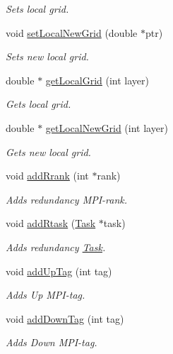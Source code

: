 \begin{DoxyCompactItemize}
\begin{DoxyCompactList}\small\item\em Sets local grid. \end{DoxyCompactList}\item 
void \hyperlink{classTask_ab1bfcab76d0b801d21139fa2280a0c4d}{set\+Local\+New\+Grid} (double $\ast$ptr)
\begin{DoxyCompactList}\small\item\em Sets new local grid. \end{DoxyCompactList}\item 
double $\ast$ \hyperlink{classTask_a0a3647a3c3b957a204f9d50a17438524}{get\+Local\+Grid} (int layer)
\begin{DoxyCompactList}\small\item\em Gets local grid. \end{DoxyCompactList}\item 
double $\ast$ \hyperlink{classTask_aa589e673faa616d16dcf305df0f98f7c}{get\+Local\+New\+Grid} (int layer)
\begin{DoxyCompactList}\small\item\em Gets new local grid. \end{DoxyCompactList}\item 
void \hyperlink{classTask_a1e6121b88342e745c95a5299b4d97ffd}{add\+Rrank} (int $\ast$rank)
\begin{DoxyCompactList}\small\item\em Adds redundancy M\+P\+I-\/rank. \end{DoxyCompactList}\item 
void \hyperlink{classTask_aa6908a92f145c47dd0d36fb898d4365b}{add\+Rtask} (\hyperlink{classTask}{Task} $\ast$task)
\begin{DoxyCompactList}\small\item\em Adds redundancy \hyperlink{classTask}{Task}. \end{DoxyCompactList}\item 
void \hyperlink{classTask_a85e6a3c8d0661623f2595144b0d4353d}{add\+Up\+Tag} (int tag)
\begin{DoxyCompactList}\small\item\em Adds Up M\+P\+I-\/tag. \end{DoxyCompactList}\item 
void \hyperlink{classTask_a3c2deaef40ecb7ee551ad0c9e86c3e2f}{add\+Down\+Tag} (int tag)
\begin{DoxyCompactList}\small\item\em Adds Down M\+P\+I-\/tag. \end{DoxyCompactList}\item 

\end{DoxyCompactItemize}

